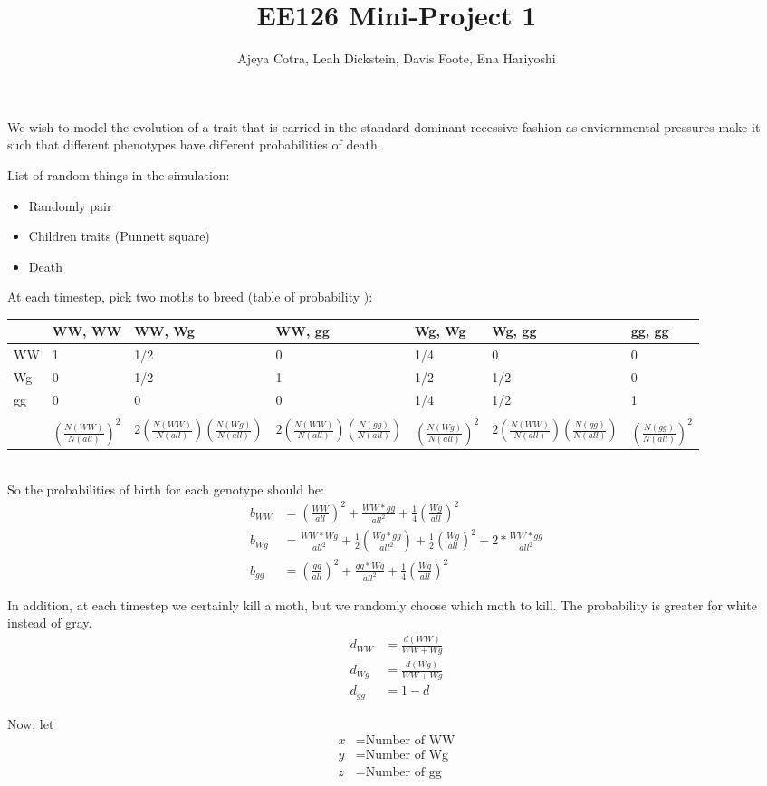 \documentclass[leqno]{article}
\begin{document}
\title{EE126 Mini-Project 1}
\author{Ajeya Cotra, Leah Dickstein, Davis Foote, Ena Hariyoshi}

\maketitle

We wish to model the evolution of a trait that is carried in the standard dominant-recessive fashion as enviornmental pressures make it such that different phenotypes have different probabilities of death. %

List of random things in the simulation:
\begin{itemize}
\item Randomly pair
\item Children traits (Punnett square)
\item Death
\end{itemize}

At each timestep, pick two moths to breed (table of probability ):\\  
\begin{tabular}{l|l|l|l|l|l|l}
{} & WW, WW & WW, Wg & WW, gg & Wg, Wg & Wg, gg & gg, gg\\
\hline
WW & 1 & 1/2 & 0 & 1/4 & 0 & 0\\
Wg & 0 & 1/2 & 1 & 1/2 & 1/2 & 0\\
gg & 0 & 0 & 0 & 1/4 & 1/2 & 1\\
\hline\\
{} & $(\frac{N(WW)}{N(all)})^2$ & $2(\frac{N(WW)}{N(all)})(\frac{N(Wg)}{N(all)})$ & $2(\frac{N(WW)}{N(all)})(\frac{N(gg)}{N(all)})$ & $(\frac{N(Wg)}{N(all)})^2$ & $2(\frac{N(WW)}{N(all)})(\frac{N(gg)}{N(all)})$ & $(\frac{N(gg)}{N(all)})^2$
\end{tabular}\\

So the probabilities of birth for each genotype should be:
\begin{align*}
b_{WW} &= \left(\frac{WW}{all} \right)^2 + \frac{WW*gg}{all^2} + \frac{1}{4}\left(\frac{Wg}{all}\right)^2\\
b_{Wg} &= \frac{WW*Wg}{all^2} + \frac{1}{2}\left(\frac{Wg*gg}{all^2}\right) + \frac{1}{2}\left(\frac{Wg}{all}\right)^2 + 2*\frac{WW*gg}{all^2}\\
b_{gg} &= \left(\frac{gg}{all}\right)^2 + \frac{gg*Wg}{all^2} + \frac{1}{4} \left(\frac{Wg}{all}\right)^2
\end{align*}

In addition, at each timestep we certainly kill a moth, but we randomly choose which moth to kill. The probability is greater for white instead of gray.
\begin{align*}
d_{WW} &= \frac{d(WW)}{WW+Wg}\\
d_{Wg} &= \frac{d(Wg)}{WW+Wg}\\
d_{gg} &= 1-d
\end{align*}

Now, let
\begin{align*}
x &= \text{Number of WW}\\
y &= \text{Number of Wg}\\
z &= \text{Number of gg}
\end{align*}

\end{document}
